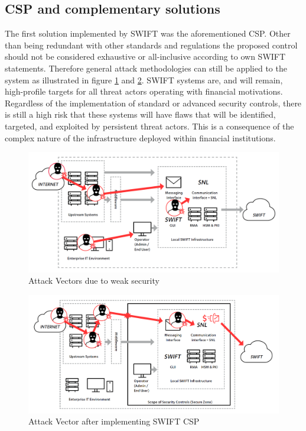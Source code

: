 \documentclass[12pt]{article}
\begin{document}
        \subsection{CSP and complementary solutions}
        The first solution implemented by SWIFT was the aforementioned CSP. Other than being redundant with other standards and regulations the proposed control should not be considered exhaustive or all-inclusive according to own SWIFT statements. 
        Therefore general attack methodologies can still be applied to the system as illustrated in figure \ref{fig:before} and \ref{fig:after}. SWIFT systems are, and will remain, high-profile targets for all threat actors operating with financial motivations. Regardless of the implementation of standard or advanced security controls, there is still a high risk that these systems will have flaws that will be identified, targeted, and exploited by persistent threat actors. This is a consequence of the complex nature of the infrastructure deployed within financial institutions.
        
        \begin{figure}[H]
        \centering
        \includegraphics[width=\textwidth,cfbox=red 0.1mm 0.1mm]{figures/before.png}
        \caption{Attack Vectors due to weak security}
        \label{fig:before}
        \end{figure}
        
        \begin{figure}[H]
        \centering
        \includegraphics[width=\textwidth,cfbox=red 0.1mm 0.1mm]{figures/after.png}
        \caption{Attack Vector after implementing SWIFT CSP}
        \label{fig:after}
        \end{figure}
        
\end{document}
